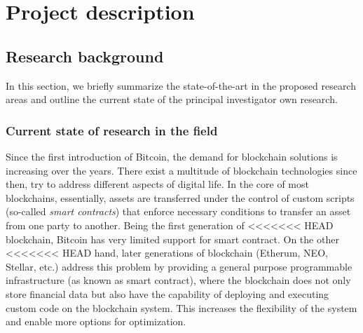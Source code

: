 \newpage
\setcounter{page}{1}
\section{Project description}

\subsection{Research background}

In this section, we briefly summarize the state-of-the-art in the proposed
research areas and outline the current state of the principal investigator own
research.

\subsubsection{Current state of research in the field}
Since the first introduction of Bitcoin, the demand for blockchain solutions is
increasing over the years. There exist a multitude of blockchain technologies since
then, try to address different aspects of digital life. In the core of most
blockchains, essentially, assets are transferred under the control of custom
scripts (so-called \emph{smart contracts}) that enforce necessary conditions to
transfer an asset from one party to another. Being the first generation of
<<<<<<< HEAD
blockchain, Bitcoin has very limited support for smart contract. On the other
<<<<<<< HEAD
hand, later generations of blockchain (Etherum, NEO, Stellar, etc.) address this
problem by providing a general purpose programmable infrastructure (as known as
smart contract), where the blockchain does not only store financial data but
also have the capability of deploying and executing custom code on the
blockchain system. This increases the flexibility of the system and enable more
options for optimization.



